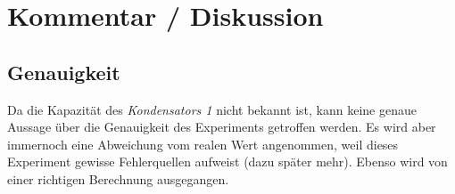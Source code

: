 \documentclass[a4paper,12pt]{article}
\begin{document}
%
%
%
%
%
%
%

\section{Kommentar / Diskussion}

\subsection{Genauigkeit}

Da die Kapazität des \textit{Kondensators 1} nicht bekannt ist, kann keine genaue Aussage über die Genauigkeit des Experiments getroffen werden. Es wird aber immernoch eine Abweichung vom realen Wert angenommen, weil dieses Experiment gewisse Fehlerquellen aufweist (dazu später mehr). Ebenso wird von einer richtigen Berechnung ausgegangen.\\




\end{document}
